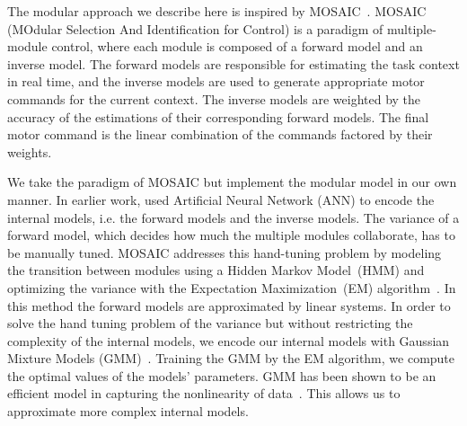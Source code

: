 

The modular approach we describe here is inspired by
MOSAIC~\citep{haruno2001mosaic}. MOSAIC (MOdular Selection And
Identification for Control) is a paradigm of multiple-module control,
where each module is composed of a forward model and an inverse
model. The forward models are responsible for estimating the task
context in real time, and the inverse models are used to generate
appropriate motor commands for the current context. The inverse models
are weighted by the accuracy of the estimations of their corresponding
forward models. The final motor command is the linear combination of
the commands factored by their weights.

We take the paradigm of MOSAIC but implement the modular model in our
own manner. In earlier work, \citet{wolpert1998multiple} used
Artificial Neural Network (ANN) to encode the internal models,
i.e. the forward models and the inverse models. The variance of a
forward model, which decides how much the multiple modules
collaborate, has to be manually tuned. MOSAIC addresses this
hand-tuning problem by modeling the transition between modules using a
Hidden Markov Model~(HMM) and optimizing the variance with the
Expectation Maximization~(EM) algorithm~\citep{haruno2001mosaic}. In
this method the forward models are approximated by linear systems. In
order to
solve the hand tuning problem of the variance but without restricting the
complexity of the internal models, we encode our internal models with
Gaussian Mixture Models (GMM)~\citep{cohn1996active}.  Training the
GMM by the EM algorithm, we compute the optimal values of the models'
parameters. GMM has been shown to be an efficient model in capturing
the nonlinearity of
data~\citep{calinon2007incremental,sauser2011iterative,huang2013learning}.
This allows us to approximate more complex internal models.

